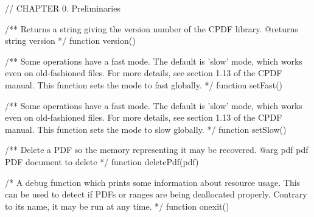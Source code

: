 // CHAPTER 0. Preliminaries

/** Returns a string giving the version number of the CPDF library.
@returns {string} version */
function version() {}

/** Some operations have a fast mode. The default is 'slow' mode, which works
even on old-fashioned files. For more details, see section 1.13 of the CPDF
manual. This function sets the mode to fast globally. */
function setFast() {}

/** Some operations have a fast mode. The default is 'slow' mode, which works
even on old-fashioned files. For more details, see section 1.13 of the CPDF
manual. This function sets the mode to slow globally. */
function setSlow() {}

/** Delete a PDF so the memory representing it may be recovered.
@arg {pdf} pdf PDF document to delete */
function deletePdf(pdf) {}

/* A debug function which prints some information about resource usage. This
can be used to detect if PDFs or ranges are being deallocated properly.
Contrary to its name, it may be run at any time. */
function onexit() {}

